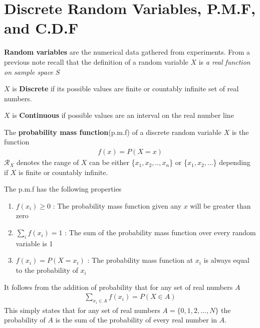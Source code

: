 \documentclass[12pt, titlepage, oneside]{article}
\renewcommand{\b}[1]{\textbf{#1}}
\begin{document}
	
	\setcounter{section}{5}
	\setcounter{page}{15}
    \section{Discrete Random Variables, P.M.F, and C.D.F}
    \b{Random variables} are the numerical data gathered from experiments. From a previous note recall that the definition of a random variable $X$ is \textit{a real function on sample space} $S$

    $X$ is \b{Discrete} if its possible values are finite or countably infinite set of real numbers.

    $X$ is \b{Continuous} if possible values are an interval on the real number line

    The \b{probability mass function}(p.m.f) of a discrete random variable $X$ is the function
    \begin{align}
      f(x) =  P(X = x)
    \end{align}
    $\mathcal{R}_X$ denotes the range of $X$ can be either \{$x_1, x_2 ,.., x_n$\} or \{$x_1, x_2 ,...$\} depending if $X$ is finite or countably infinite.

    The p.m.f has the following properties
    \begin{enumerate}
      \item $f(x_i) \geq 0 $ : The probability mass function given any $x$ will be greater than zero
      \item $\sum_i f(x_i) = 1$ : The sum of the probability mass function over every random variable is 1
      \item $f(x_i) = P(X = x_i)$ : The probability mass function at $x_i$ is always equal to the probability of $x_i$
    \end{enumerate}
    It follows from the addition of probability that for any set of real numbers $A$
    \begin{align}
      \sum_{x_i\in A} f(x_i) = P(X \in A)
    \end{align}
    This simply states that for any set of real numbers $A = \{0,1,2,...,N\}$ the probability of $A$ is the sum of the probability of every real number in $A$.
\end{document}
